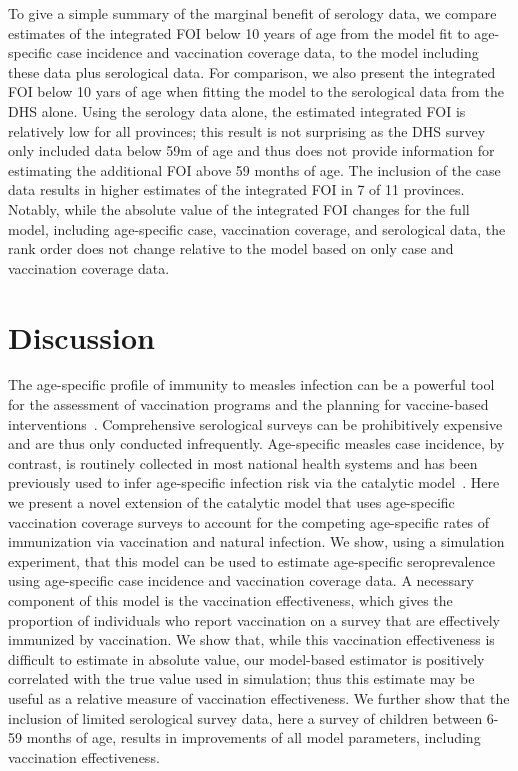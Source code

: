 \documentclass[nofootinbib,aps,pre,twocolumn,superscriptaddress,showkeys,showpacs]{revtex4-1}
\begin{document}
To give a simple summary of the marginal benefit of serology data, we compare estimates of the integrated FOI below 10 years of age from the model fit to age-specific case incidence and vaccination coverage data, to the model including these data plus serological data.  For comparison, we also present the integrated FOI below 10 yars of age when fitting the model to the serological data from the DHS alone.  Using the serology data alone, the estimated integrated FOI is relatively low for all provinces; this result is not surprising as the DHS survey only included data below 59m of age and thus does not provide information for estimating the additional FOI above 59 months of age.  The inclusion of the case data results in higher estimates of the integrated FOI in 7 of 11 provinces.  Notably, while the absolute value of the integrated FOI changes for the full model, including age-specific case, vaccination coverage, and serological data, the rank order does not change relative to the model based on only case and vaccination coverage data. 

\section{Discussion \label{sec:Discussion}}

The age-specific profile of immunity to measles infection can be a powerful tool for the assessment of vaccination programs and the planning for vaccine-based interventions~\cite{CuttsHanson, Winter2018Sero}. Comprehensive serological surveys can be prohibitively expensive and are thus only conducted infrequently.  Age-specific measles case incidence, by contrast, is routinely collected in most national health systems and has been previously used to infer age-specific infection risk via the catalytic model~\cite{griffiths_catalytic_1974, Grenfell1985, farrington_correlated_2013, Ferrari2010FOI}. Here we present a novel extension of the catalytic model that uses age-specific vaccination coverage surveys to account for the competing age-specific rates of immunization via vaccination and natural infection.  We show, using a simulation experiment, that this model can be used to estimate age-specific seroprevalence using age-specific case incidence and vaccination coverage data. A necessary component of this model is the vaccination effectiveness, which gives the proportion of individuals who report vaccination on a survey that are effectively immunized by vaccination.  We show that, while this vaccination effectiveness is difficult to estimate in absolute value, our model-based estimator is positively correlated with the true value used in simulation; thus this estimate may be useful as a relative measure of vaccination effectiveness.  We further show that the inclusion of limited serological survey data, here a survey of children between 6-59 months of age, results in improvements of all model parameters, including vaccination effectiveness. 
\end{document}
